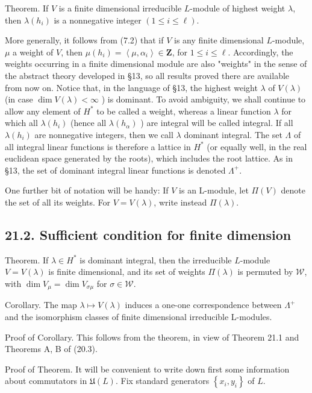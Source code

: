 \documentclass[10pt]{article}
\begin{document}
Theorem. If $V$ is a finite dimensional irreducible $L$-module of highest weight $\lambda$, then $\lambda\left(h_{i}\right)$ is a nonnegative integer $(1 \leq i \leq \ell)$.

More generally, it follows from (7.2) that if $V$ is any finite dimensional $L$-module, $\mu$ a weight of $V$, then $\mu\left(h_{i}\right)=\left\langle\mu, \alpha_{i}\right\rangle \in \mathbf{Z}$, for $1 \leq i \leq \ell$. Accordingly, the weights occurring in a finite dimensional module are also "weights" in the sense of the abstract theory developed in §13, so all results proved there are available from now on. Notice that, in the language of §13, the highest weight $\lambda$ of $V(\lambda)$ (in case $\operatorname{dim} V(\lambda)<\infty$ ) is dominant. To avoid ambiguity, we shall continue to allow any element of $H^{*}$ to be called a weight, whereas a linear function $\lambda$ for which all $\lambda\left(h_{i}\right)$ (hence all $\lambda\left(h_{\alpha}\right)$ ) are integral will be called integral. If all $\lambda\left(h_{i}\right)$ are nonnegative integers, then we call $\lambda$ dominant integral. The set $\Lambda$ of all integral linear functions is therefore a lattice in $H^{*}$ (or equally well, in the real euclidean space generated by the roots), which includes the root lattice. As in §13, the set of dominant integral linear functions is denoted $\Lambda^{+}$.

One further bit of notation will be handy: If $V$ is an L-module, let $\Pi(V)$ denote the set of all its weights. For $V=V(\lambda)$, write instead $\Pi(\lambda)$.

\subsection*{21.2. Sufficient condition for finite dimension}
Theorem. If $\lambda \in H^{*}$ is dominant integral, then the irreducible $L$-module $V=V(\lambda)$ is finite dimensional, and its set of weights $\Pi(\lambda)$ is permuted by $\mathscr{W}$, with $\operatorname{dim} V_{\mu}=\operatorname{dim} V_{\sigma \mu}$ for $\sigma \in \mathscr{W}$.

Corollary. The map $\lambda \mapsto V(\lambda)$ induces a one-one correspondence between $\Lambda^{+}$and the isomorphism classes of finite dimensional irreducible L-modules.

Proof of Corollary. This follows from the theorem, in view of Theorem 21.1 and Theorems A, B of (20.3).

Proof of Theorem. It will be convenient to write down first some information about commutators in $\mathfrak{U}(L)$. Fix standard generators $\left\{x_{i}, y_{i}\right\}$ of $L$.
\end{document}
